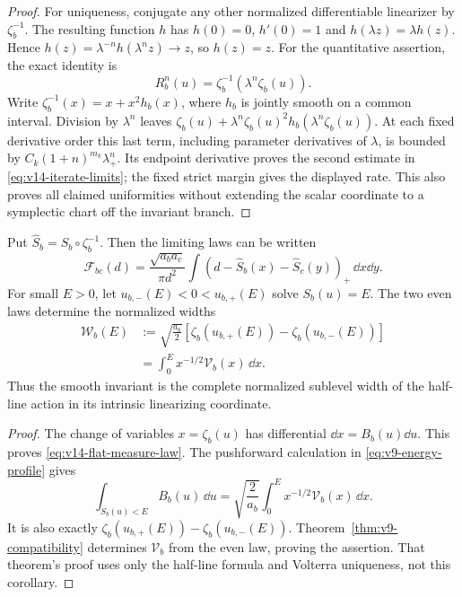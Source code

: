 \begin{proof}
For uniqueness, conjugate any other normalized differentiable
linearizer by $\zeta_b^{-1}$. The resulting function $h$ has
$h(0)=0$, $h'(0)=1$ and $h(\lambda z)=\lambda h(z)$. Hence
$h(z)=\lambda^{-n}h(\lambda^nz)\to z$, so $h(z)=z$.
For the quantitative assertion, the exact identity is
\[
 R_b^n(u)=\zeta_b^{-1}(\lambda^n\zeta_b(u)).
\]
Write $\zeta_b^{-1}(x)=x+x^2h_b(x)$, where $h_b$ is jointly
smooth on a common interval. Division by $\lambda^n$ leaves
$\zeta_b(u)+\lambda^n\zeta_b(u)^2h_b(\lambda^n\zeta_b(u))$.
At each fixed derivative order this last term, including parameter
derivatives of $\lambda$, is bounded by
$C_k(1+n)^{m_k}\lambda_+^n$. Its endpoint derivative proves the
second estimate in \eqref{eq:v14-iterate-limits}; the fixed strict
margin gives the displayed rate. This also proves all claimed
uniformities without extending the scalar coordinate to a symplectic
chart off the invariant branch.
\end{proof}

\begin{corollary}
\label{cor:v14-width}
Put $\widehat S_b=S_b\circ\zeta_b^{-1}$. Then the limiting laws
can be written
\begin{equation}\label{eq:v14-flat-measure-law}
 \mathcal F_{bc}(d)=\frac{\sqrt{a_ba_c}}{\pi d^2}
       \int(d-\widehat S_b(x)-\widehat S_c(y))_+\,\dd x\dd y.
\end{equation}
For small $E>0$, let $u_{b,-}(E)<0<u_{b,+}(E)$ solve $S_b(u)=E$.
The two even laws determine the normalized widths
\begin{equation}\label{eq:v14-width}
 \begin{split}
 \mathcal W_b(E)
   &:=\sqrt{\frac{a_b}{2}}
       [\zeta_b(u_{b,+}(E))-\zeta_b(u_{b,-}(E))]\\
   &=\int_0^E x^{-1/2}\mathcal V_b(x)\,\dd x.
 \end{split}
\end{equation}
Thus the smooth invariant is the complete normalized sublevel width
of the half-line action in its intrinsic linearizing coordinate.
\end{corollary}
\begin{proof}
The change of variables $x=\zeta_b(u)$ has differential
$\dd x=B_b(u)\dd u$. This proves \eqref{eq:v14-flat-measure-law}.
The pushforward calculation in \eqref{eq:v9-energy-profile} gives
\[
 \int_{S_b(u)<E}B_b(u)\,\dd u
       =\sqrt{\frac2{a_b}}\int_0^E x^{-1/2}\mathcal V_b(x)\,\dd x.
\]
It is also exactly
$\zeta_b(u_{b,+}(E))-\zeta_b(u_{b,-}(E))$.
Theorem~\ref{thm:v9-compatibility} determines $\mathcal V_b$ from
the even law, proving the assertion. That theorem's proof uses only
the half-line formula and Volterra uniqueness, not this corollary.
\end{proof}

